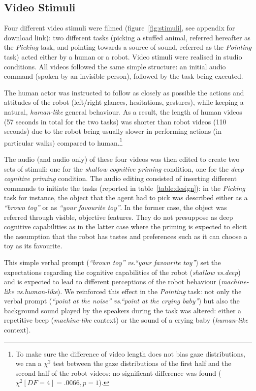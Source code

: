 \documentclass[lettersize, noapacite, twoside, HRI]{apa_HRI}
\newcommand{\vs}{\textit{vs.}\xspace}
\begin{document}
\subsection{Video Stimuli}

Four different video stimuli were filmed (figure~\ref{fig:stimuli}, see appendix
for download link): two
different tasks (picking a stuffed animal, referred hereafter as the
\emph{Picking} task, and pointing towards a source of sound, referred as the
\emph{Pointing} task) acted either by a human or a robot. Video stimuli were
realised in studio conditions. All videos followed the same simple structure: an
initial audio command (spoken by an invisible person), followed by the task
being executed.

The human actor was instructed to follow as closely as possible the actions and
attitudes of the robot (left/right glances, hesitations, gestures), while keeping a
natural, \emph{human-like} general behaviour. As a result, the length of human videos
(57 seconds in total for the two tasks) was shorter than robot videos (110
seconds) due to the robot being usually slower in performing actions (in
particular walks) compared to human.\footnote{To make sure the difference of
video length does not bias gaze distributions, we ran a $\chi^2$ test between
the gaze distributions of the first half and the second half of the robot
videos: no significant difference was found ($\chi^2[DF=4]=.0066, p=1$).}

The audio (and audio only) of these four videos was then edited to create two
sets of stimuli: one for the \emph{shallow cognitive priming} condition, one for
the \emph{deep cognitive priming} condition. The audio editing consisted of 
inserting different commands to initiate the tasks (reported in
table~\ref{table:design}): in the \emph{Picking} task for instance, the object
that the agent had to pick was described either as a \emph{``brown toy''} or as
\emph{``your favourite toy''}. In the former case, the object was referred through
visible, objective features. They do not presuppose as deep cognitive capabilities
as in the latter case where the priming is expected to elicit the assumption
that the robot has tastes and preferences such as it can choose a toy as its favourite.

This simple verbal prompt (\emph{``brown toy''} \vs \emph{``your favourite
toy''}) set the expectations regarding the cognitive capabilities of the robot
(\emph{shallow} \vs \emph{deep}) and is expected to lead to different
perceptions of the robot behaviour (\emph{machine-like} \vs \emph{human-like}). We
reinforced this effect in the \emph{Pointing} task: not only the verbal prompt
(\emph{``point at the noise''} \vs \emph{``point at the crying baby''}) but also
the background sound played by the speakers during the task was altered: either a
repetitive beep (\emph{machine-like} context) or the sound of a crying baby
(\emph{human-like} context).
\end{document}
